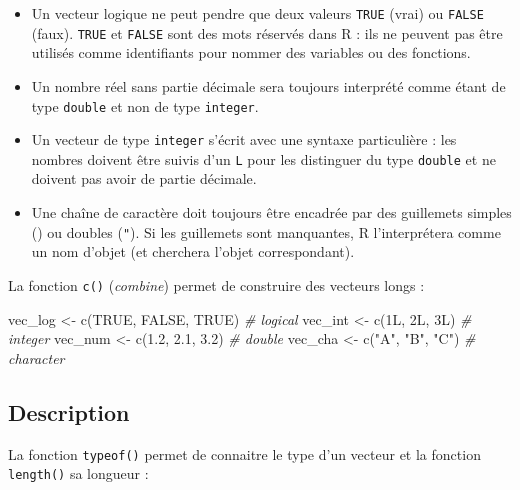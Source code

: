 \documentclass[
  french,
]{scrbook}
\newenvironment{Shaded}{\begin{snugshade}}{\end{snugshade}}
\newcommand{\CommentTok}[1]{\textcolor[rgb]{0.56,0.35,0.01}{\textit{#1}}}
\newcommand{\ConstantTok}[1]{\textcolor[rgb]{0.00,0.00,0.00}{#1}}
\newcommand{\FloatTok}[1]{\textcolor[rgb]{0.00,0.00,0.81}{#1}}
\newcommand{\FunctionTok}[1]{\textcolor[rgb]{0.00,0.00,0.00}{#1}}
\newcommand{\NormalTok}[1]{#1}
\newcommand{\OtherTok}[1]{\textcolor[rgb]{0.56,0.35,0.01}{#1}}
\newcommand{\StringTok}[1]{\textcolor[rgb]{0.31,0.60,0.02}{#1}}
\providecommand{\tightlist}{%
  \setlength{\itemsep}{0pt}\setlength{\parskip}{0pt}}
\begin{document}
\begin{itemize}
\tightlist
\item
  Un vecteur logique ne peut pendre que deux valeurs \texttt{TRUE} (vrai) ou \texttt{FALSE} (faux). \texttt{TRUE} et \texttt{FALSE} sont des mots réservés dans R : ils ne peuvent pas être utilisés comme identifiants pour nommer des variables ou des fonctions.
\item
  Un nombre réel sans partie décimale sera toujours interprété comme étant de type \texttt{double} et non de type \texttt{integer}.
\item
  Un vecteur de type \texttt{integer} s'écrit avec une syntaxe particulière : les nombres doivent être suivis d'un \texttt{L} pour les distinguer du type \texttt{double} et ne doivent pas avoir de partie décimale.
\item
  Une chaîne de caractère doit toujours être encadrée par des guillemets simples (\texttt{\textquotesingle{}}) ou doubles (\texttt{"}). Si les guillemets sont manquantes, R l'interprétera comme un nom d'objet (et cherchera l'objet correspondant).
\end{itemize}

La fonction \texttt{c()} (\emph{combine}) permet de construire des vecteurs longs :

\begin{Shaded}
\begin{Highlighting}[]
\NormalTok{vec\_log }\OtherTok{\textless{}{-}} \FunctionTok{c}\NormalTok{(}\ConstantTok{TRUE}\NormalTok{, }\ConstantTok{FALSE}\NormalTok{, }\ConstantTok{TRUE}\NormalTok{) }\CommentTok{\# logical}
\NormalTok{vec\_int }\OtherTok{\textless{}{-}} \FunctionTok{c}\NormalTok{(1L, 2L, 3L)        }\CommentTok{\# integer}
\NormalTok{vec\_num }\OtherTok{\textless{}{-}} \FunctionTok{c}\NormalTok{(}\FloatTok{1.2}\NormalTok{, }\FloatTok{2.1}\NormalTok{, }\FloatTok{3.2}\NormalTok{)     }\CommentTok{\# double}
\NormalTok{vec\_cha }\OtherTok{\textless{}{-}} \FunctionTok{c}\NormalTok{(}\StringTok{"A"}\NormalTok{, }\StringTok{"B"}\NormalTok{, }\StringTok{"C"}\NormalTok{)     }\CommentTok{\# character}
\end{Highlighting}
\end{Shaded}

\hypertarget{description}{%
\subsection{Description}\label{description}}

La fonction \texttt{typeof()} permet de connaitre le type d'un vecteur et la fonction \texttt{length()} sa longueur :
\end{document}
